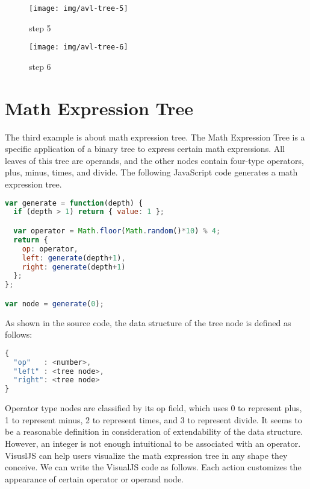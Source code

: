 \begin{figure}
  \begin{minipage}{0.5\hsize}
  \begin{center}
    \texttt{[image: img/avl-tree-5]}
    \caption{step 5}
    \label{fig: step 5}
  \end{center}
  \end{minipage}
  \begin{minipage}{0.5\hsize}
  \begin{center}
    \texttt{[image: img/avl-tree-6]}
    \caption{step 6}
    \label{fig: step 6}
  \end{center}
  \end{minipage}
\end{figure}

\section {Math Expression Tree}

The third example is about math expression tree. The Math Expression Tree is a specific application of a binary tree to express certain math expressions. All leaves of this tree are operands, and the other nodes contain four-type operators, plus, minus, times, and divide. The following JavaScript code generates a math expression tree.

\begin{lstlisting}[language=JavaScript]
var generate = function(depth) {
  if (depth > 1) return { value: 1 };

  var operator = Math.floor(Math.random()*10) % 4;
  return {
    op: operator,
    left: generate(depth+1),
    right: generate(depth+1)
  };
};

var node = generate(0);
\end{lstlisting}

As shown in the source code, the data structure of the tree node is defined as follows:

\begin{lstlisting}[language=JavaScript]
{
  "op"   : <number>,
  "left" : <tree node>,
  "right": <tree node>
}
\end{lstlisting}

Operator type nodes are classified by its op field, which uses 0 to represent plus, 1 to represent minus, 2 to represent times, and 3 to represent divide. It seems to be a reasonable definition in consideration of extendability of the data structure. However, an integer is not enough intuitional to be associated with an operator. VisuslJS can help users visualize the math expression tree in any shape they conceive. We can write the VisualJS code as follows. Each action customizes the appearance of certain operator or operand node.

